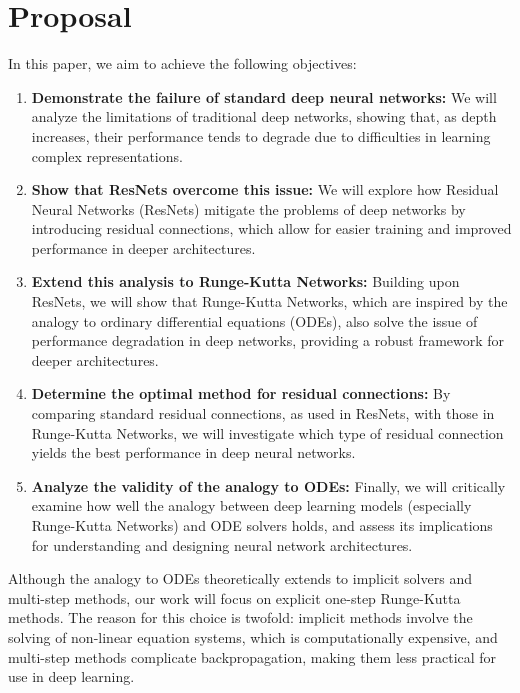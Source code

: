 \documentclass{article}
\begin{document}
\section{Proposal}
In this paper, we aim to achieve the following objectives:

\begin{enumerate}
	\label{hyp1}
    \item \textbf{Demonstrate the failure of standard deep neural networks:} We will analyze the limitations of traditional deep networks, showing that, as depth increases, their performance tends to degrade due to difficulties in learning complex representations.
   
   	\label{hyp2} 
    \item \textbf{Show that ResNets overcome this issue:} We will explore how Residual Neural Networks (ResNets) mitigate the problems of deep networks by introducing residual connections, which allow for easier training and improved performance in deeper architectures.
    
    	\label{hyp3}
    \item \textbf{Extend this analysis to Runge-Kutta Networks:} Building upon ResNets, we will show that Runge-Kutta Networks, which are inspired by the analogy to ordinary differential equations (ODEs), also solve the issue of performance degradation in deep networks, providing a robust framework for deeper architectures.
    
    	\label{hyp4}
    \item \textbf{Determine the optimal method for residual connections:} By comparing standard residual connections, as used in ResNets, with those in Runge-Kutta Networks, we will investigate which type of residual connection yields the best performance in deep neural networks.
    
    	\label{hyp5}
    \item \textbf{Analyze the validity of the analogy to ODEs:} Finally, we will critically examine how well the analogy between deep learning models (especially Runge-Kutta Networks) and ODE solvers holds, and assess its implications for understanding and designing neural network architectures.
\end{enumerate}

Although the analogy to ODEs theoretically extends to implicit solvers and multi-step methods, our work will focus on explicit one-step Runge-Kutta methods. The reason for this choice is twofold: implicit methods involve the solving of non-linear equation systems, which is computationally expensive, and multi-step methods complicate backpropagation, making them less practical for use in deep learning.
\end{document}
